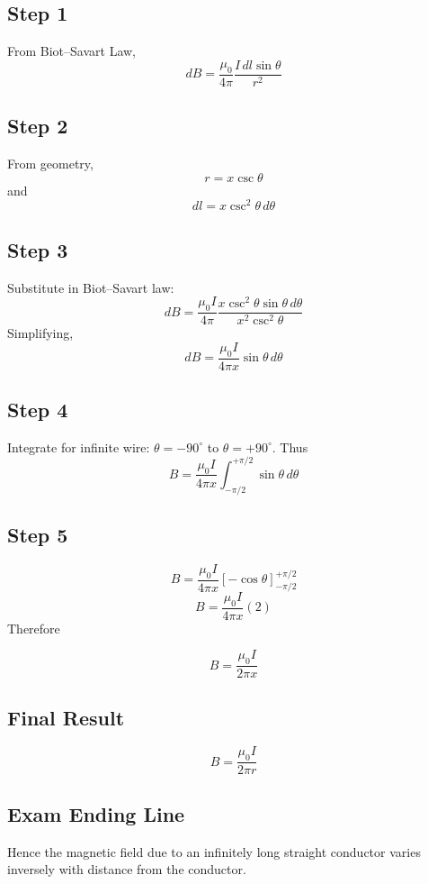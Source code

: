\documentclass[11pt,a4paper]{article}
\begin{document}
\subsection*{Step 1}
From Biot--Savart Law,
\[ dB = \frac{\mu_0}{4\pi} \frac{I \, dl \sin\theta}{r^2} \]

\subsection*{Step 2}
From geometry,
\[ r = x \csc\theta \]
and
\[ dl = x \csc^2\theta \, d\theta \]

\subsection*{Step 3}
Substitute in Biot--Savart law:
\[ dB = \frac{\mu_0 I}{4\pi} \frac{x \csc^2\theta \sin\theta \, d\theta}{x^2 \csc^2\theta} \]
Simplifying,
\[ dB = \frac{\mu_0 I}{4\pi x} \sin\theta \, d\theta \]

\subsection*{Step 4}
Integrate for infinite wire:
\( \theta = -90^\circ \) to \( \theta = +90^\circ \).
Thus
\[ B = \frac{\mu_0 I}{4\pi x} \int_{-\pi/2}^{+\pi/2} \sin\theta \, d\theta \]

\subsection*{Step 5}
\[ B = \frac{\mu_0 I}{4\pi x} \left[ -\cos\theta \right]_{-\pi/2}^{+\pi/2} \]
\[ B = \frac{\mu_0 I}{4\pi x} (2) \]
Therefore
\begin{tcolorbox}[colback=RoyalBlue!5!white, colframe=RoyalBlue]
    \[ B = \frac{\mu_0 I}{2\pi x} \]
\end{tcolorbox}

\subsection*{Final Result}
\begin{tcolorbox}[colback=RoyalBlue!5!white, colframe=RoyalBlue]
    \[ B = \frac{\mu_0 I}{2\pi r} \]
\end{tcolorbox}

\subsection*{Exam Ending Line}
Hence the magnetic field due to an infinitely long straight conductor varies inversely with distance from the conductor.
\end{document}
